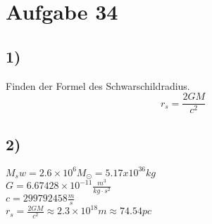 \section{Aufgabe 34}
\subsection{1)}
Finden der Formel des Schwarschildradius.
\begin{equation}
r_s = \frac{2GM}{c^2}
\end{equation}
\subsection{2)}
$M_sw = 2.6 \times 10^{6} M_\odot =  5.17x10^{36} kg$\\
$G = 6.67428 \times 10^{-11} \frac{m^3}{kg \cdot s^2}$\\
$c = 299 792 458 \frac{m}{s}$\\
$r_s = \frac{2GM}{c^2} \approx 2.3 \times 10^{18} m \approx 74.54 pc $\\
